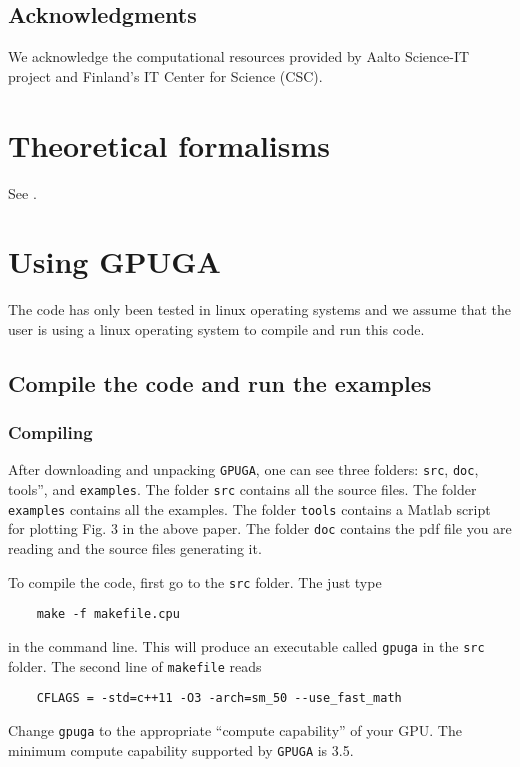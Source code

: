 \documentclass[12pt,a4paper]{report}
\begin{document}
\section{Acknowledgments}
We acknowledge the computational resources provided by Aalto Science-IT project and Finland's IT Center for Science (CSC).

\chapter{Theoretical formalisms\label{section:theory}}

See \cite{fan2019arxiv}. 

\chapter{Using GPUGA \label{section:usage}}

The code has only been tested in linux operating systems and we assume that the user is using a linux operating system to compile and run this code.

\section{Compile the code and run the examples}

\subsection{Compiling}

After downloading and unpacking \verb"GPUGA", one can see three folders:  \verb"src",  \verb"doc",  \verb''tools'', and \verb"examples". The folder \verb"src" contains all the source files. The folder \verb"examples" contains all the examples. The folder \verb"tools" contains a Matlab script for plotting Fig. 3 in the above paper. The folder \verb"doc" contains the pdf file you are reading and the source files generating it.

To compile the code, first go to the \verb"src" folder. The just type
\begin{verbatim}
    make -f makefile.cpu
\end{verbatim}
in the command line. This will produce an executable called \verb"gpuga" in the \verb"src" folder. The second line of \verb"makefile" reads
\begin{verbatim}
    CFLAGS = -std=c++11 -O3 -arch=sm_50 --use_fast_math
\end{verbatim}
Change \verb"gpuga" to the appropriate ``compute capability'' of your GPU. The minimum compute capability supported by \verb"GPUGA" is 3.5.
\end{document}

